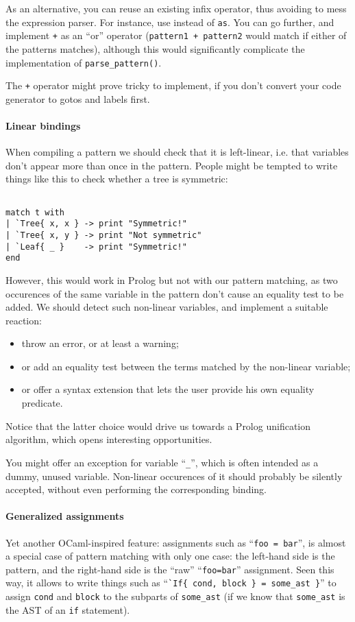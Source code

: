 As an alternative, you can reuse an existing infix operator, thus
avoiding to mess the expression parser. For instance, use {\tt *}
instead of {\tt as}. You can go further, and implement {\tt +} as an
``or'' operator ({\tt pattern1 + pattern2} would match if either
of the patterns matches), although this would significantly complicate
the implementation of {\tt parse\_pattern()}. 

The {\tt+} operator might prove tricky to implement, if you don't
convert your code generator to gotos and labels first.

\paragraph{Linear bindings}
When compiling a pattern we should check that it is left-linear,
i.e. that variables don't appear more than once in the pattern. People
might be tempted to write things like this to check whether a tree is
symmetric:
\begin{Verbatim}[fontsize=\scriptsize]

match t with
| `Tree{ x, x } -> print "Symmetric!"
| `Tree{ x, y } -> print "Not symmetric"
| `Leaf{ _ }    -> print "Symmetric!"
end
\end{Verbatim}
However, this would work in Prolog but not with our pattern matching,
as two occurences of the same variable in the pattern don't cause an
equality test to be added. We should detect such non-linear variables,
and implement a suitable reaction:
\begin{itemize}
\item throw an error, or at least a warning;
\item or add an equality test between the terms matched by the
  non-linear variable;
\item or offer a syntax extension that lets the user provide his own
  equality predicate.
\end{itemize}

Notice that the latter choice would drive us towards a Prolog
unification algorithm, which opens interesting opportunities.

You might offer an exception for variable ``{\tt\_}'', which is often
intended as a dummy, unused variable. Non-linear occurences of it
should probably be silently accepted, without even performing the
corresponding binding. 

\paragraph{Generalized assignments}
Yet another OCaml-inspired feature: assignments such as
``\verb|foo = bar|'', is almost a special
case of pattern matching with only one case: the left-hand side is
the pattern, and the right-hand side is the ``raw'' ``\verb|foo=bar|''
assignment. Seen this way, it allows to write things such as
``\verb|`If{ cond, block } = some_ast }|'' to assign \verb|cond| and
\verb|block| to the subparts of \verb|some_ast| (if we know that
\verb|some_ast| is the AST of an \verb|if| statement). 

